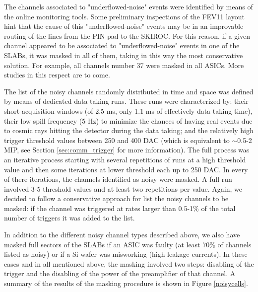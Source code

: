 \documentclass[a4paper,11pt]{article}
\begin{document}
The channels associated to "underflowed-noise" events were identified by means of the online monitoring
tools. Some preliminary inspections of the FEV11 layout hint that
the cause of this "underflowed-noise" events may be in an improvable routing of the
lines from the PIN pad to the SKIROC. 
For this reason, if a given channel appeared to be associated 
to "underflowed-noise" events in one of the SLABs, 
it was masked in all of them, taking in this way the most conservative solution.
For example, all channels number 37 were masked in all ASICs.
More studies in this respect are to come.

The list of the noisy channels randomly distributed in time and space was
defined by means of dedicated data taking runs. 
These runs were characterized by: their short acquisition windows (of 2.5 ms, only 1.1 ms 
of effectively data taking time), their low
spill frequency (5 Hz) to minimize the chances of having real events due to cosmic rays 
hitting the detector during the
data taking; and the relatively high trigger threshold values between 250 and 400 DAC 
(which is equivalent to $\sim$0.5-2 MIP, see Section \ref{sec:comm_trigger} for more 
information). The full process was an iterative process starting with several repetitions
of runs at a high threshold value and then some iterations at lower threshold each up to 250 DAC. 
In every of there iterations, the channels identified as noisy were masked.
A full run involved 3-5 threshold values and at least two repetitions per value.
Again, we decided to follow a conservative approach for list the noisy channels to be masked:
if the channel was triggered at rates larger than 0.5-1\% of the total number of triggers it was added to the list.

In addition to the different noisy channel types described above, we also have
masked full sectors of the SLABs if an ASIC was faulty (at least 70\% of channels 
listed as noisy) or if a Si-wafer was misworking (high leakage currents). In these cases 
and in all mentioned above, the masking involved two steps: disabling of the trigger and 
the disabling of the power of the preamplifier of that channel. A summary of the results of the masking procedure is shown in Figure \ref{noisycells}.
\end{document}
